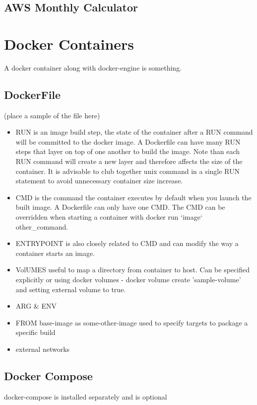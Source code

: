 \pagebreak

\subsection{AWS Monthly Calculator}

\pagebreak
\section{Docker Containers}
A docker container along with docker-engine is something. 

\subsection{DockerFile}
(place a sample of the file here)
\begin{itemize}
\item RUN is an image build step, the state of the container after a RUN command will be committed to the docker image.
  A Dockerfile can have many RUN steps that layer on top of one another to build the image. Note than each RUN command
  will create a new layer and therefore affects the size of the container. It is advisable to club together unix command
  in a single RUN statement to avoid unnecessary container size increase.
\item CMD is the command the container executes by default when you launch the built image.
  A Dockerfile can only have one CMD. The CMD can be overridden when starting a container with docker run
  `image` other_command.
\item ENTRYPOINT is also closely related to CMD and can modify the way a container starts an image.
\item VolUMES useful to map a directory from container to host. Can be specified explicitly or using docker
  volumes - docker volume create 'sample-volume' and setting external volume to true.
\item ARG & ENV
\item FROM base-image as some-other-image used to specify targets to package a specific build
\item external networks
\end{itemize}


\subsection{Docker Compose}
docker-compose is installed separately and is optional